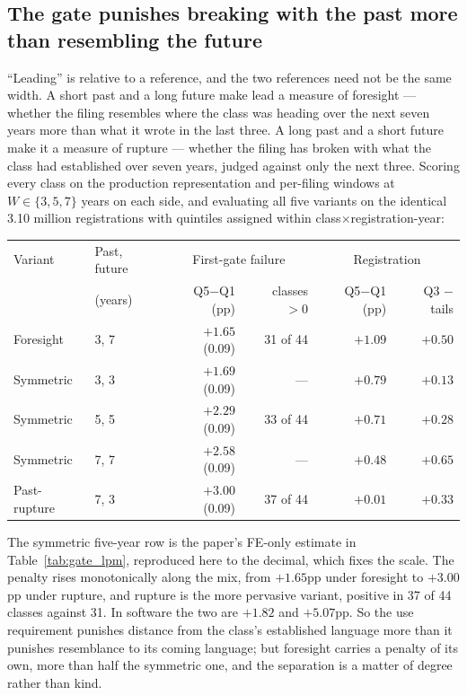 \subsection{The gate punishes breaking with the past more than resembling the future}\label{app:wmix}

``Leading'' is relative to a reference, and the two references need not be
the same width. A short past and a long future make lead a measure of
foresight --- whether the filing resembles where the class was heading over
the next seven years more than what it wrote in the last three. A long past
and a short future make it a measure of rupture --- whether the filing has
broken with what the class had established over seven years, judged against
only the next three. Scoring every class on the production representation
and per-filing windows at $W \in \{3, 5, 7\}$ years on each side, and
evaluating all five variants on the identical 3.10 million registrations
with quintiles assigned within class$\times$registration-year:

\begin{center}\small
\begin{tabular}{llrrrr}
\toprule
Variant & Past, future & \multicolumn{2}{c}{First-gate failure} & \multicolumn{2}{c}{Registration} \\
 & (years) & Q5$-$Q1 (pp) & classes $>0$ & Q5$-$Q1 (pp) & Q3 $-$ tails \\
\midrule
Foresight     & 3, 7 & $+1.65$ (0.09) & 31 of 44 & $+1.09$ & $+0.50$ \\
Symmetric     & 3, 3 & $+1.69$ (0.09) & ---      & $+0.79$ & $+0.13$ \\
Symmetric     & 5, 5 & $+2.29$ (0.09) & 33 of 44 & $+0.71$ & $+0.28$ \\
Symmetric     & 7, 7 & $+2.58$ (0.09) & ---      & $+0.48$ & $+0.65$ \\
Past-rupture  & 7, 3 & $+3.00$ (0.09) & 37 of 44 & $+0.01$ & $+0.33$ \\
\bottomrule
\end{tabular}
\end{center}

\noindent The symmetric five-year row is the paper's FE-only estimate in
Table~\ref{tab:gate_lpm}, reproduced here to the decimal, which fixes the
scale. The penalty rises monotonically along the mix, from $+1.65$pp under
foresight to $+3.00$pp under rupture, and rupture is the more pervasive
variant, positive in 37 of 44 classes against 31. In software the two are
$+1.82$ and $+5.07$pp. So the use requirement punishes distance from the
class's established language more than it punishes resemblance to its
coming language; but foresight carries a penalty of its own, more than half
the symmetric one, and the separation is a matter of degree rather than
kind.

